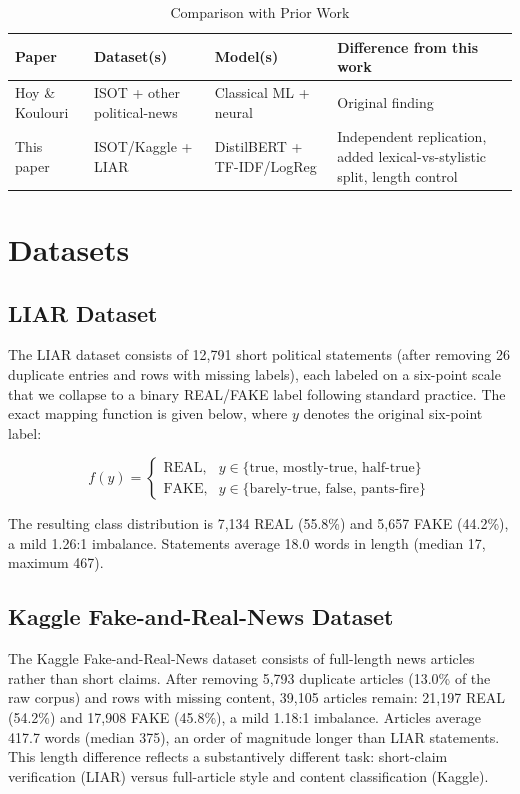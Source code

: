 \documentclass[conference]{IEEEtran}
\begin{document}
\begin{table}[!t]
\caption{Comparison with Prior Work}
\centering
\begin{tabular}{p{1.1cm}p{1.5cm}p{1.5cm}p{2.3cm}}
\toprule
Paper & Dataset(s) & Model(s) & Difference from this work \\
\midrule
Hoy \& Koulouri \cite{hoy2022} & ISOT + other political-news & Classical ML + neural & Original finding \\
This paper & ISOT/Kaggle + LIAR & DistilBERT + TF-IDF/LogReg & Independent replication, added lexical-vs-stylistic split, length control \\
\bottomrule
\end{tabular}
\end{table}

\section{Datasets}
\subsection{LIAR Dataset}
The LIAR dataset consists of 12,791 short political statements (after removing 26 duplicate entries and rows with missing labels), each labeled on a six-point scale that we collapse to a binary REAL/FAKE label following standard practice. The exact mapping function is given below, where $y$ denotes the original six-point label:

\begin{equation}
f(y) = \begin{cases}
\text{REAL}, & y \in \{\text{true, mostly-true, half-true}\} \\
\text{FAKE}, & y \in \{\text{barely-true, false, pants-fire}\}
\end{cases}
\end{equation}

The resulting class distribution is 7,134 REAL (55.8\%) and 5,657 FAKE (44.2\%), a mild 1.26:1 imbalance. Statements average 18.0 words in length (median 17, maximum 467).

\subsection{Kaggle Fake-and-Real-News Dataset}
The Kaggle Fake-and-Real-News dataset consists of full-length news articles rather than short claims. After removing 5,793 duplicate articles (13.0\% of the raw corpus) and rows with missing content, 39,105 articles remain: 21,197 REAL (54.2\%) and 17,908 FAKE (45.8\%), a mild 1.18:1 imbalance. Articles average 417.7 words (median 375), an order of magnitude longer than LIAR statements. This length difference reflects a substantively different task: short-claim verification (LIAR) versus full-article style and content classification (Kaggle).
\end{document}
